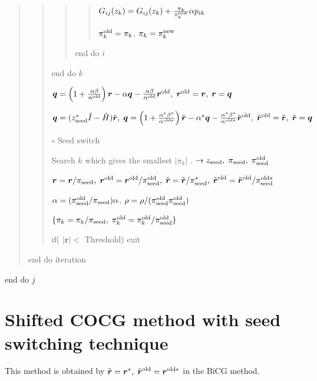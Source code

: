 \documentclass[letterpaper,10pt,dvipdfmx,openany]{sphinxmanual}
\begin{document}
\begin{quote}
\begin{quote}
\begin{quote}
\begin{quote}
\(G_{i j}(z_k) = G_{i j}(z_k) + \frac{\pi_k}{\pi_k^{\rm new}} \alpha p_{i k}\)

\(\pi_k^{\rm old} = \pi_k\), \(\pi_k = \pi_k^{\rm new}\)
\end{quote}

end do \(i\)
\end{quote}

end do \(k\)

\({\boldsymbol q} = \left( 1 + \frac{\alpha \beta}{\alpha^{\rm old}} \right) {\boldsymbol r} - \alpha {\boldsymbol q} - \frac{\alpha \beta}{\alpha^{\rm old}} {\boldsymbol r}^{\rm old},\; {\boldsymbol r}^{\rm old} = {\boldsymbol r},\; {\boldsymbol r} = {\boldsymbol q}\)

\({\boldsymbol q} = (z_{\rm seed}^* {\hat I} - {\hat H}) {\tilde {\boldsymbol r}},\; {\boldsymbol q} = \left( 1 + \frac{\alpha^* \beta^*}{\alpha^{{\rm old}*}} \right) {\tilde {\boldsymbol r}} - \alpha^* {\boldsymbol q} - \frac{\alpha^* \beta^*}{\alpha^{{\rm old} *}} {\tilde {\boldsymbol r}}^{\rm old},\; {\tilde {\boldsymbol r}}^{\rm old} = {\tilde {\boldsymbol r}},\; {\tilde {\boldsymbol r}} = {\boldsymbol q}\)

\(\circ\) Seed switch

Search \(k\) which gives the smallest \(|\pi_k|\) . \(\rightarrow z_{\rm seed},\; \pi_{\rm seed},\; \pi_{\rm seed}^{\rm old}\)

\({\boldsymbol r} = {\boldsymbol r} / \pi_{\rm seed},\; {\boldsymbol r}^{\rm old} = {\boldsymbol r}^{\rm old} / \pi_{\rm seed}^{\rm old},\; {\tilde {\boldsymbol r}} = {\tilde {\boldsymbol r}} / \pi_{\rm seed}^*,\; {\tilde {\boldsymbol r}}^{\rm old} = {\tilde {\boldsymbol r}}^{\rm old} / \pi_{\rm seed}^{{\rm old}*}\)

\(\alpha = (\pi_{\rm seed}^{\rm old} / \pi_{\rm seed}) \alpha\), \(\rho = \rho / (\pi_{\rm seed}^{\rm old} \pi_{\rm seed}^{\rm old})\)

\(\{\pi_k = \pi_k / \pi_{\rm seed},\; \pi_k^{\rm old} = \pi_k^{\rm old} / \pi_{\rm seed}^{\rm old}\}\)

if( \(|{\boldsymbol r}| <\) Threshold) exit
\end{quote}

end do iteration
\end{quote}

end do \(j\)


\section{Shifted COCG method with seed switching technique}
\label{komega_algorithm_en:shifted-cocg-method-with-seed-switching-technique}
This method is obtained by
\({\tilde {\boldsymbol r}} = {\boldsymbol r}^*,\; {\tilde {\boldsymbol r}}^{\rm old} = {\boldsymbol r}^{{\rm old}*}\)
in the BiCG method.
\end{document}
